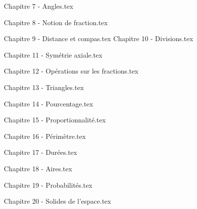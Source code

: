 \documentclass[a4paper,12pt,twoside]{article}
\numberwithin{dummy}{section}
\theoremstyle{ocrenumboxTh}
\theoremstyle{ocrenumboxExercice}
\theoremstyle{ocrenumboxExercice}
\theoremstyle{ocrenumboxEx}
\theoremstyle{ocrenumboxEx}
\theoremstyle{ocrenumboxTh}
\theoremstyle{ocrenumboxTh*}
\theoremstyle{ocrenumboxTh}
\theoremstyle{ocrenumboxTh*}
\theoremstyle{ocrenumboxCoro}
\theoremstyle{ocrenumboxCoro*}
\theoremstyle{ocrenumboxCoro}
\theoremstyle{ocrenumboxCoro*}
\theoremstyle{ocrenumboxProp}
\theoremstyle{ocrenumboxProp*}
\theoremstyle{ocrenumboxProp}
\theoremstyle{ocrenumboxProp*}
\theoremstyle{ocrenumboxMéthode}
\theoremstyle{ocrenumboxMéthode}
\theoremstyle{ocrenumboxDef}
\theoremstyle{ocrenumboxDef*}
\theoremstyle{ocrenumboxDef}
\theoremstyle{ocrenumboxDef*}
\theoremstyle{ocrenumboxReg}
\theoremstyle{ocrenumboxReg*}
\theoremstyle{ocrenumboxReg}
\theoremstyle{ocrenumboxReg*}
\theoremstyle{ocrenumboxVoc}
\theoremstyle{ocrenumboxVoc}
\theoremstyle{ocrenumboxNot}
\theoremstyle{ocrenumboxNot}
\theoremstyle{ocrenumboxNot*}
\theoremstyle{ocrenumboxNot*}
\theoremstyle{ocrenum}
\begin{document}
\newpage

{Chapitre 7 - Angles.tex}

\newpage
{}
{Chapitre 8 - Notion de fraction.tex}

\newpage

{Chapitre 9 - Distance et compas.tex}
\newpage
{Chapitre 10 -  Divisions.tex}

\newpage

{Chapitre 11 - Symétrie axiale.tex}


\newpage

{Chapitre 12 - Opérations sur les fractions.tex}

\newpage

{Chapitre 13 - Triangles.tex}

\newpage

{Chapitre 14 - Pourcentage.tex}

\newpage

{Chapitre 15 - Proportionnalité.tex}

\newpage

{Chapitre 16 - Périmètre.tex}

\newpage
{}
{Chapitre 17 - Durées.tex}

\newpage
{Chapitre 18 - Aires.tex}

\newpage

{Chapitre 19 - Probabilités.tex}

\newpage

{Chapitre 20 - Solides de l'espace.tex}
\end{document}
